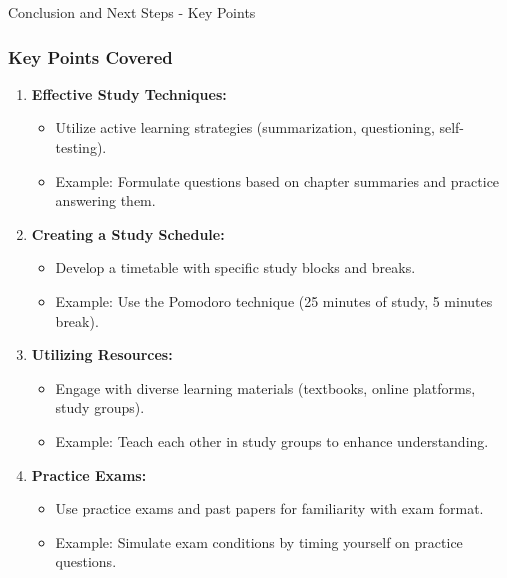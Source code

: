 \documentclass[aspectratio=169]{beamer}
\begin{document}
\begin{frame}[fragile]{Conclusion and Next Steps - Key Points}
    \frametitle{Key Points Covered}

    \begin{enumerate}
        \item \textbf{Effective Study Techniques:}
        \begin{itemize}
            \item Utilize active learning strategies (summarization, questioning, self-testing).
            \item Example: Formulate questions based on chapter summaries and practice answering them.
        \end{itemize}

        \item \textbf{Creating a Study Schedule:}
        \begin{itemize}
            \item Develop a timetable with specific study blocks and breaks.
            \item Example: Use the Pomodoro technique (25 minutes of study, 5 minutes break).
        \end{itemize}

        \item \textbf{Utilizing Resources:}
        \begin{itemize}
            \item Engage with diverse learning materials (textbooks, online platforms, study groups).
            \item Example: Teach each other in study groups to enhance understanding.
        \end{itemize}

        \item \textbf{Practice Exams:}
        \begin{itemize}
            \item Use practice exams and past papers for familiarity with exam format.
            \item Example: Simulate exam conditions by timing yourself on practice questions.
        \end{itemize}
    \end{enumerate}

\end{frame}
\end{document}

